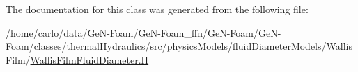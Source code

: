 The documentation for this class was generated from the following file\+:\begin{DoxyCompactItemize}
\item 
/home/carlo/data/\+Ge\+N-\/\+Foam/\+Ge\+N-\/\+Foam\+\_\+ffn/\+Ge\+N-\/\+Foam/\+Ge\+N-\/\+Foam/classes/thermal\+Hydraulics/src/physics\+Models/fluid\+Diameter\+Models/\+Wallis\+Film/\hyperlink{WallisFilmFluidDiameter_8H}{Wallis\+Film\+Fluid\+Diameter.\+H}\end{DoxyCompactItemize}
